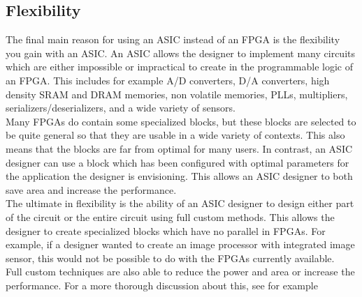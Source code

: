 \subsection{Flexibility}
The final main reason for using an ASIC instead of an FPGA is the flexibility
you gain with an ASIC. An ASIC allows the designer to implement
many circuits which are either impossible or impractical to create
in the programmable logic of an FPGA. This includes for example A/D
converters, D/A converters, high density SRAM and DRAM memories,
non volatile memories, PLLs, multipliers, serializers/deserializers, and
a wide variety of sensors.\\
Many FPGAs do contain some specialized blocks, but these blocks are
selected to be quite general so that they are usable in a wide variety of
contexts. This also means that the blocks are far from optimal for many
users. In contrast, an ASIC designer can use a block which has been
configured with optimal parameters for the application the designer is
envisioning. This allows an ASIC designer to both save area and increase
the performance.\\
The ultimate in flexibility is the ability of an ASIC designer to design
either part of the circuit or the entire circuit using full custom methods.
This allows the designer to create specialized blocks which have no parallel
in FPGAs. For example, if a designer wanted to create an image
processor with integrated image sensor, this would not be possible to do with the FPGAs currently available.\\
Full custom techniques are also able to reduce the power and area or
increase the performance. For a more thorough discussion about this, see
for example \cite{asic4}
